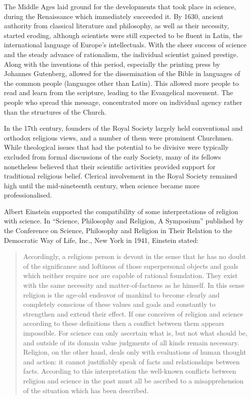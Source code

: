 The Middle Ages laid ground for the developments that took place in science, during the Renaissance which immediately succeeded it. By 1630, ancient authority from classical literature and philosophy, as well as their necessity, started eroding, although scientists were still expected to be fluent in Latin, the international language of Europe's intellectuals. With the sheer success of science and the steady advance of rationalism, the individual scientist gained prestige. Along with the inventions of this period, especially the printing press by Johannes Gutenberg, allowed for the dissemination of the Bible in languages of the common people (languages other than Latin). This allowed more people to read and learn from the scripture, leading to the Evangelical movement. The people who spread this message, concentrated more on individual agency rather than the structures of the Church.

In the 17th century, founders of the Royal Society largely held conventional and orthodox religious views, and a number of them were prominent Churchmen. While theological issues that had the potential to be divisive were typically excluded from formal discussions of the early Society, many of its fellows nonetheless believed that their scientific activities provided support for traditional religious belief. Clerical involvement in the Royal Society remained high until the mid-nineteenth century, when science became more professionalised.

Albert Einstein supported the compatibility of some interpretations of religion with science. In ``Science, Philosophy and Religion, A Symposium'' published by the Conference on Science, Philosophy and Religion in Their Relation to the Democratic Way of Life, Inc., New York in 1941, Einstein stated:

\begin{quote}
Accordingly, a religious person is devout in the sense that he has no doubt of the significance and loftiness of those superpersonal objects and goals which neither require nor are capable of rational foundation. They exist with the same necessity and matter-of-factness as he himself. In this sense religion is the age-old endeavor of mankind to become clearly and completely conscious of these values and goals and constantly to strengthen and extend their effect. If one conceives of religion and science according to these definitions then a conflict between them appears impossible. For science can only ascertain what is, but not what should be, and outside of its domain value judgments of all kinds remain necessary. Religion, on the other hand, deals only with evaluations of human thought and action: it cannot justifiably speak of facts and relationships between facts. According to this interpretation the well-known conflicts between religion and science in the past must all be ascribed to a misapprehension of the situation which has been described.
\end{quote}

